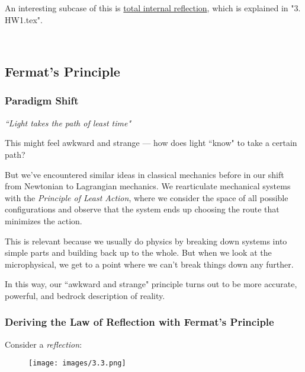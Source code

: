 \documentclass{article}
\begin{document}
An interesting subcase of this is \underline{total internal reflection}, which is explained in "3. HW1.tex".


\
\hline
\subsection{Fermat's Principle}
\subsubsection{Paradigm Shift}
\begin{center}
\textit{``Light takes the path of least time"}
\end{center}


This might feel awkward and strange — how does light ``know" to take a certain path?



But we've encountered similar ideas in classical mechanics before in our shift from Newtonian to Lagrangian mechanics. We rearticulate mechanical systems with the \textit{Principle of Least Action}, where we consider the space of all possible configurations and observe that the system ends up choosing the route that minimizes the action.



This is relevant because we usually do physics by breaking down systems into simple parts and building back up to the whole. But when we look at the microphysical, we get to a point where we can't break things down any further. 



In this way, our ``awkward and strange" principle turns out to be more accurate, powerful, and bedrock description of reality.


\subsubsection{Deriving the Law of Reflection with Fermat's Principle}

Consider a \textit{reflection}:

\begin{figure}[htp]
    \centering
    \texttt{[image: images/3.3.png]}
\end{figure}
\end{document}
